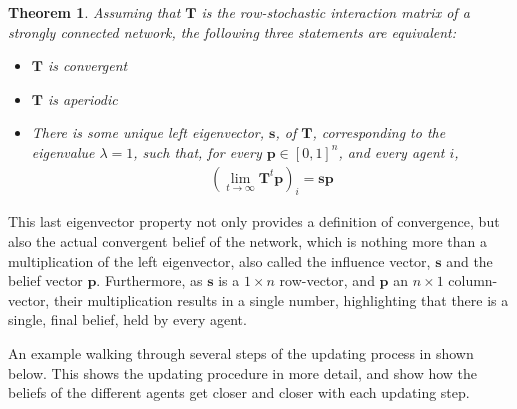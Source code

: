 \documentclass[a4paper, 12pt]{report}
\newtheorem{theorem}{Theorem}
\newcommand{\T}{\bm{T}}
\begin{document}
\begin{theorem}
\label{convergence:theorem}
\noindent Assuming that $\T$ is the row-stochastic interaction matrix of a strongly connected network, the following three statements are equivalent:
\begin{itemize}
    \item[-] $\T$ is convergent
    \item[-] $\T$ is aperiodic
    \item[-] There is some unique left eigenvector, $\bm{s}$, of $\T$, corresponding to the eigenvalue $\lambda=1$, such that, for every $\bm{p}\in [0,1]^n$, and every agent $i$,
    \begin{align*}
        (\lim_{t\to\infty}\T^t\bm{p})_i = \bm{sp}
    \end{align*}
\end{itemize}
\end{theorem}

\noindent This last eigenvector property not only provides a definition of convergence, but also the actual convergent belief of the network, which is nothing more than a multiplication of the left eigenvector, also called the influence vector, $\bm{s}$ and the belief vector $\bm{p}$. Furthermore, as $\bm{s}$ is a $1 \times n$ row-vector, and $\bm{p}$ an $n \times 1$ column-vector, their multiplication results in a single number, highlighting that there is a single, final belief, held by every agent.

\noindent An example walking through several steps of the updating process in shown below. This shows the updating procedure in more detail, and show how the beliefs of the different agents get closer and closer with each updating step.
\end{document}
